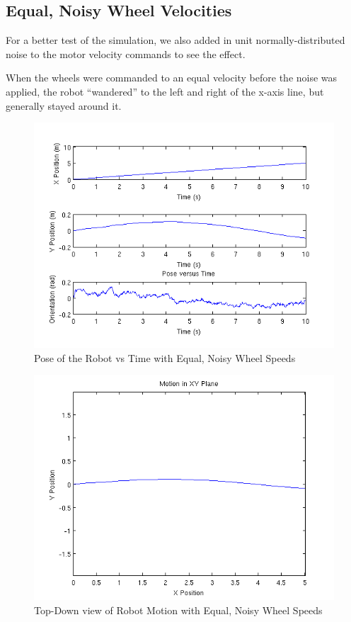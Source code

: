 \documentclass[10pt]{amsart}
\begin{document}
\newpage
\subsection{Equal, Noisy Wheel Velocities}
For a better test of the simulation, we also added in unit normally-distributed noise to the motor velocity commands to see the effect.

When the wheels were commanded to an equal velocity before the noise was applied, the robot ``wandered'' to the left and right of the x-axis line, but generally stayed around it.

\begin{figure}[h]
 \centering
 \includegraphics[scale=0.5,keepaspectratio=true]{equalnoisepose.png}
 \caption{Pose of the Robot vs Time with Equal, Noisy Wheel Speeds}
 \label{fig:equalnoisepose}
\end{figure}

\begin{figure}[h]
 \centering
 \includegraphics[scale=0.5,keepaspectratio=true]{equalnoiseplane.png}
 \caption{Top-Down view of Robot Motion with Equal, Noisy Wheel Speeds}
 \label{fig:equalnoiseplane}
\end{figure}
\end{document}
